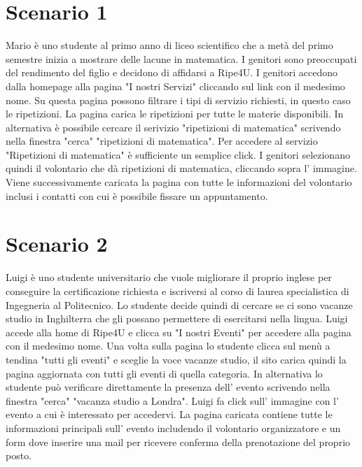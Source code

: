 
    \section{Scenario 1}
    Mario è uno studente al primo anno di liceo scientifico che a metà del primo
    semestre inizia a mostrare delle lacune in matematica. I genitori sono
    preoccupati del rendimento del figlio e decidono di affidarsi a Ripe4U. I
    genitori accedono dalla homepage alla pagina "I nostri Servizi" cliccando
    sul link con il medesimo nome. Su questa pagina possono filtrare i tipi di
    servizio richiesti, in questo caso le ripetizioni. La pagina carica le
    ripetizioni per tutte le materie disponibili. In alternativa è possibile
    cercare il serivizio "ripetizioni di matematica" scrivendo nella finestra
    "cerca" "ripetizioni di matematica". Per accedere al servizio "Ripetizioni
    di matematica" è sufficiente un semplice click. I genitori selezionano
    quindi il volontario che dà ripetizioni di matematica, cliccando sopra l'
    immagine. Viene successivamente caricata la pagina con tutte le informazioni
    del volontario inclusi i contatti con cui è possibile fissare un
    appuntamento.

    \section{Scenario 2}
    Luigi è uno studente universitario che vuole migliorare il proprio inglese
    per conseguire la certificazione richiesta e iscriversi al corso di laurea
    specialistica di Ingegneria al Politecnico. Lo studente decide quindi di cercare
    se ci sono vacanze studio in Inghilterra che gli possano permettere di
    esercitarsi nella lingua. Luigi accede alla home di Ripe4U e clicca su "I nostri
    Eventi" per accedere alla pagina con il medesimo nome. Una volta sulla pagina lo
    studente clicca sul menù a tendina "tutti gli eventi" e sceglie la voce
    vacanze studio, il sito carica quindi la pagina aggiornata con tutti gli
    eventi di quella categoria. In alternativa lo studente può
    verificare direttamente la presenza dell' evento scrivendo nella finestra
    "cerca" "vacanza studio a Londra". Luigi fa click sull' immagine con l'
    evento a cui è interessato per accedervi. La pagina caricata contiene tutte le
    informazioni principali sull' evento includendo il volontario organizzatore e un
    form dove inserire una mail per ricevere conferma della prenotazione del proprio
    posto.

